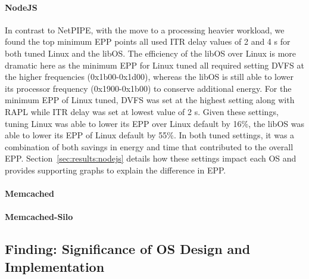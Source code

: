 \paragraph{NodeJS} In contrast to NetPIPE, with the move to a processing heavier workload, we found the top minimum EPP points all used ITR delay values of 2 and 4 \micro s for both tuned Linux and the libOS. The efficiency of the libOS over Linux is more dramatic here as the minimum EPP for Linux tuned all required setting DVFS at the higher frequencies (0x1b00-0x1d00), whereas the libOS is still able to lower its processor frequency (0x1900-0x1b00) to conserve additional energy. For the minimum EPP of Linux tuned, DVFS was set at the highest setting along with RAPL while ITR delay was set at lowest value of 2 \micro s. Given these settings, tuning Linux was able to lower its EPP over Linux default by 16\%, the libOS was able to lower its EPP of Linux default by 55\%. In both tuned settings, it was a combination of both savings in energy and time that contributed to the overall EPP. Section~\ref{sec:results:nodejs} details how these settings impact each OS and provides supporting graphs to explain the difference in EPP.



\paragraph{Memcached}



\paragraph{Memcached-Silo}

\subsection{Finding: Significance of OS Design and Implementation}

